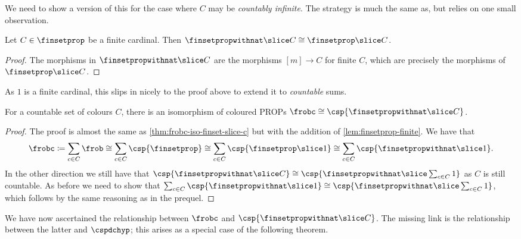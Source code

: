 We need to show a version of this for the case where \(C\) may be
\emph{countably infinite}.
The strategy is much the same as, but relies on one small observation.

\begin{lemma}
    \label{lem:finsetprop-finite}
    Let \(C \in \finsetprop\) be a finite cardinal.
    Then \(\finsetpropwithnat \slice C \cong \finsetprop \slice C\).
\end{lemma}
\begin{proof}
    The morphisms in \(\finsetpropwithnat \slice C\) are the morphisms
    \([m] \to C\) for finite \(C\), which are precisely the morphisms of
    \(\finsetprop \slice C\).
\end{proof}

As \(1\) is a finite cardinal, this slips in nicely to the proof above to extend
it to \emph{countable} sums.

\begin{theorem}
    \label{thm:frobc-iso-hatfinset-slice-c}
    For a countable set of colours \(C\), there is an isomorphism of coloured
    PROPs \(\frobc \cong \csp{\finsetpropwithnat \slice C}\).
\end{theorem}
\begin{proof}
    The proof is almost the same as \cref{thm:frobc-iso-finset-slice-c} but with
    the addition of \cref{lem:finsetprop-finite}.
    We have that \[
        \frobc
        \coloneqq
        \sum_{c \in C}\frob
        \cong
        \sum_{c \in C}\csp{\finsetprop}
        \cong
        \sum_{c \in C}\csp{\finsetprop \slice 1}
        \cong
        \sum_{c \in C}\csp{\finsetpropwithnat \slice 1}.
    \]
    In the other direction we still have that \(
        \csp{\finsetpropwithnat \slice C}
        \cong
        \csp{\finsetpropwithnat \slice \sum_{c \in C} 1}
    \) as \(C\) is still countable.
    As before we need to show that \(
        \sum_{c \in C}\csp{\finsetpropwithnat \slice 1}
        \cong
        \csp{\finsetpropwithnat \slice \sum_{c \in C} 1}
    \), which follows by the same reasoning as in the prequel.
\end{proof}

We have now ascertained the relationship between \(\frobc\) and
\(\csp{\finsetpropwithnat \slice C}\).
The missing link is the relationship between the latter and \(\cspdchyp\);
this arises as a special case of the following theorem.


